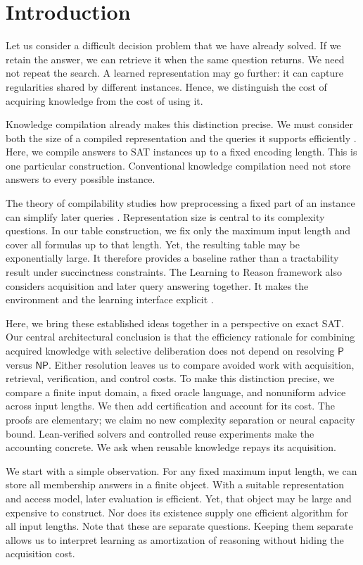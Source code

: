 \documentclass[11pt,a4paper]{article}
\numberwithin{equation}{section}
\newcommand{\Pclass}{\mathsf{P}}
\newcommand{\NPclass}{\mathsf{NP}}
\theoremstyle{plain}
\theoremstyle{definition}
\theoremstyle{remark}
\begin{document}
\section{Introduction}

Let us consider a difficult decision problem that we have already solved. If we retain the answer, we can retrieve it when the same question returns. We need not repeat the search. A learned representation may go further: it can capture regularities shared by different instances. Hence, we distinguish the cost of acquiring knowledge from the cost of using it.

Knowledge compilation already makes this distinction precise. We must consider both the size of a compiled representation and the queries it supports efficiently \citep{darwiche2002}. Here, we compile answers to SAT instances up to a fixed encoding length. This is one particular construction. Conventional knowledge compilation need not store answers to every possible instance.

The theory of compilability studies how preprocessing a fixed part of an instance can simplify later queries \citep{cadoli2002}. Representation size is central to its complexity questions. In our table construction, we fix only the maximum input length and cover all formulas up to that length. Yet, the resulting table may be exponentially large. It therefore provides a baseline rather than a tractability result under succinctness constraints. The Learning to Reason framework also considers acquisition and later query answering together. It makes the environment and the learning interface explicit \citep{khardon1997}.

Here, we bring these established ideas together in a perspective on exact SAT. Our central architectural conclusion is that the efficiency rationale for combining acquired knowledge with selective deliberation does not depend on resolving $\Pclass$ versus $\NPclass$. Either resolution leaves us to compare avoided work with acquisition, retrieval, verification, and control costs. To make this distinction precise, we compare a finite input domain, a fixed oracle language, and nonuniform advice across input lengths. We then add certification and account for its cost. The proofs are elementary; we claim no new complexity separation or neural capacity bound. Lean-verified solvers and controlled reuse experiments make the accounting concrete. We ask when reusable knowledge repays its acquisition.

We start with a simple observation. For any fixed maximum input length, we can store all membership answers in a finite object. With a suitable representation and access model, later evaluation is efficient. Yet, that object may be large and expensive to construct. Nor does its existence supply one efficient algorithm for all input lengths. Note that these are separate questions. Keeping them separate allows us to interpret learning as amortization of reasoning without hiding the acquisition cost.
\end{document}
